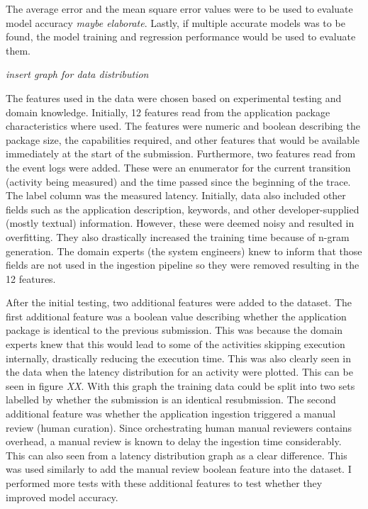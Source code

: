 \documentclass[english,12pt,a4paper,pdftex,sci,utf8]{aaltothesis}
\theoremstyle{definition}
\newcommand{\nyi}[1]{\noindent\colorbox{nyibg}{\textcolor{nyitext}{\emph{#1}}}}
\begin{document}
The average error and the mean square error values were to be used to evaluate model accuracy \nyi{maybe elaborate}.
Lastly, if multiple accurate models was to be found, the model training and regression performance would be used to evaluate them.

\nyi{insert graph for data distribution}

The features used in the data were chosen based on experimental testing and domain knowledge.
Initially, 12 features read from the application package characteristics where used. The features were numeric and boolean describing the package size, the capabilities required, and other features that would be available immediately at the start of the submission.
Furthermore, two features read from the event logs were added.
These were an enumerator for the current transition (activity being measured) and the time passed since the beginning of the trace.
The label column was the measured latency.
Initially, data also included other fields such as the application description, keywords, and other developer-supplied (mostly textual) information. 
However, these were deemed noisy and resulted in overfitting.
They also drastically increased the training time because of n-gram generation.
The domain experts (the system engineers) knew to inform that those fields are not used in the ingestion pipeline so they were removed resulting in the 12 features.

After the initial testing, two additional features were added to the dataset.
The first additional feature was a boolean value describing whether the application package is identical to the previous submission.
This was because the domain experts knew that this would lead to some of the activities skipping execution internally, drastically reducing the execution time. This was also clearly seen in the data when the latency distribution for an activity were plotted. This can be seen in figure \nyi{XX}. With this graph the training data could be split into two sets labelled by whether the submission is an identical resubmission.
The second additional feature was whether the application ingestion triggered a manual review (human curation). 
Since orchestrating human manual reviewers contains overhead, a manual review is known to delay the ingestion time considerably.
This can also seen from a latency distribution graph as a clear difference.
This was used similarly to add the manual review boolean feature into the dataset.
I performed more tests with these additional features to test whether they improved model accuracy.
\end{document}
